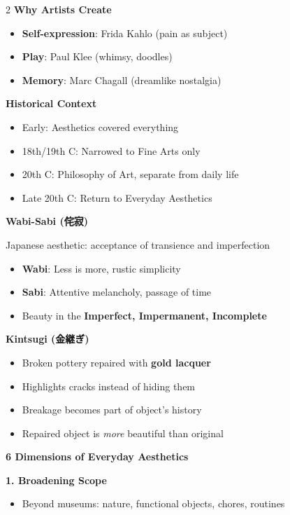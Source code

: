 \documentclass[11pt,letterpaper]{article}
\newcommand{\mysection}[1]{%
    \vspace{-0.3em}
    \colorbox{sectioncolor}{\makebox[\linewidth][l]{\bfseries\color{white}#1}}%
    \vspace{0.3em}
}
\newcommand{\mysubsection}[1]{%
    \vspace{-0.2em}
    {\bfseries\color{sectioncolor}#1}%
    \vspace{0.1em}
}
\begin{document}
\begin{multicols*}{2}
\mysubsection{Why Artists Create}
\begin{itemize}[leftmargin=*, noitemsep, topsep=0pt]
    \item \textbf{Self-expression}: Frida Kahlo (pain as subject)
    \item \textbf{Play}: Paul Klee (whimsy, doodles)
    \item \textbf{Memory}: Marc Chagall (dreamlike nostalgia)
\end{itemize}

\mysection{Part 2: Everyday Aesthetics}

\mysubsection{Historical Context}
\begin{itemize}[leftmargin=*, noitemsep, topsep=0pt]
    \item Early: Aesthetics covered everything
    \item 18th/19th C: Narrowed to Fine Arts only
    \item 20th C: Philosophy of Art, separate from daily life
    \item Late 20th C: Return to Everyday Aesthetics
\end{itemize}

\mysubsection{Wabi-Sabi (侘寂)}
Japanese aesthetic: acceptance of transience and imperfection
\begin{itemize}[leftmargin=*, noitemsep, topsep=0pt]
    \item \textbf{Wabi}: Less is more, rustic simplicity
    \item \textbf{Sabi}: Attentive melancholy, passage of time
    \item Beauty in the \textbf{Imperfect, Impermanent, Incomplete}
\end{itemize}

\mysubsection{Kintsugi (金継ぎ)}
\begin{itemize}[leftmargin=*, noitemsep, topsep=0pt]
    \item Broken pottery repaired with \textbf{gold lacquer}
    \item Highlights cracks instead of hiding them
    \item Breakage becomes part of object's history
    \item Repaired object is \textit{more} beautiful than original
\end{itemize}

\mysubsection{6 Dimensions of Everyday Aesthetics}

\textbf{1. Broadening Scope}
\begin{itemize}[leftmargin=*, noitemsep, topsep=0pt]
    \item Beyond museums: nature, functional objects, chores, routines
\end{itemize}


\end{multicols*}
\end{document}
